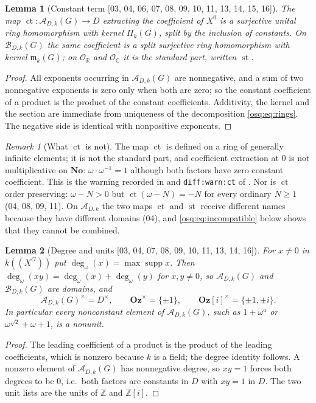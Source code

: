 \documentclass[11pt,letterpaper]{article}
\numberwithin{equation}{section}
\newtheorem{lemma}[lemma]{Lemma}
\theoremstyle{definition}
\theoremstyle{remark}
\newtheorem{remark}[remark]{Remark}
\theoremstyle{plain}
\newcommand{\No}{\mathbf{No}}
\newcommand{\Oz}{\mathbf{Oz}}
\newcommand{\GOz}{\Oz[i]}
\newcommand{\Z}{\mathbb Z}
\newcommand{\R}{\mathbb R}
\newcommand{\C}{\mathbb C}
\newcommand{\A}{\mathcal A}          %
\newcommand{\B}{\mathcal B}          %
\newcommand{\mm}{\mathfrak m}        %
\newcommand{\OO}{\mathcal O}         %
\newcommand{\hahn}[2]{#1(\!(X^{#2})\!)}
\newcommand{\ct}{\operatorname{ct}}
\newcommand{\st}{\operatorname{st}}
\newcommand{\supp}{\operatorname{supp}}
\newcommand{\degw}{\deg_{\omega}}
\newcommand{\src}[1]{\textup{\textsf{[#1]}}}
\begin{document}
\begin{lemma}[Constant term \src{03, 04, 06, 07, 08, 09, 10, 11, 13, 14, 15, 16}]\label{osq:lem:ct}
The map $\ct:\A_{D,k}(G)\to D$ extracting the coefficient of $X^0$ is a surjective
unital ring homomorphism with kernel $\Pi_k(G)$, split by the inclusion of constants.
On $\B_{D,k}(G)$ the same coefficient is a split surjective ring homomorphism with kernel
$\mm_k(G)$; on $\OO_\R$ and $\OO_\C$ it is the standard part, written $\st$.
\end{lemma}
\begin{proof}
All exponents occurring in $\A_{D,k}(G)$ are nonnegative, and a sum of two nonnegative
exponents is zero only when both are zero; so the constant coefficient of a product is the
product of the constant coefficients. Additivity, the kernel and the section are
immediate from uniqueness of the decomposition \eqref{osq:eq:rings}. The negative side is
identical with nonpositive exponents.
\end{proof}

\begin{remark}[What $\ct$ is not]\label{osq:rem:ctnot}
The map $\ct$ is defined on a ring of generally infinite elements; it is not the standard
part, and coefficient extraction at $0$ is not multiplicative on $\No$:
$\omega\cdot\omega^{-1}=1$ although both factors have zero constant coefficient. This is
the warning recorded in \cite{RepoNotation} and \nolinkurl{diff:warn:ct} of
\cite{RepoDiffEq}. Nor is $\ct$ order preserving: $\omega-N>0$ but
$\ct(\omega-N)=-N$ for every ordinary $N\ge1$ (04, 08, 09, 11). On $\A_{D,k}$ the two
maps $\ct$ and $\st$ receive different names because they have different domains
(04), and \eqref{osq:eq:incompatible} below shows that they cannot be combined.
\end{remark}

\begin{lemma}[Degree and units \src{03, 04, 07, 08, 09, 10, 11, 13, 14, 16}]\label{osq:lem:units}
For $x\neq0$ in $\hahn kG$ put $\degw(x)=\max\supp x$. Then
$\degw(xy)=\degw(x)+\degw(y)$ for $x,y\ne0$, so $\A_{D,k}(G)$ and $\B_{D,k}(G)$ are
domains, and
\[
 \A_{D,k}(G)^\times=D^\times,\qquad \Oz^\times=\{\pm1\},\qquad \GOz^\times=\{\pm1,\pm i\}.
\]
In particular every nonconstant element of $\A_{D,k}(G)$, such as $1+\omega^a$ or
$\omega^{\sqrt2}+\omega+1$, is a nonunit.
\end{lemma}
\begin{proof}
The leading coefficient of a product is the product of the leading coefficients, which is
nonzero because $k$ is a field; the degree identity follows. A nonzero element of
$\A_{D,k}(G)$ has nonnegative degree, so $xy=1$ forces both degrees to be $0$, i.e.\
both factors are constants in $D$ with $xy=1$ in $D$. The two unit lists are the units of
$\Z$ and $\Z[i]$.
\end{proof}
\end{document}
